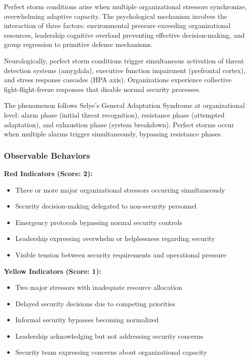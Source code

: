 \documentclass[11pt,a4paper]{article}
\begin{document}
Perfect storm conditions arise when multiple organizational stressors synchronize, overwhelming adaptive capacity. The psychological mechanism involves the interaction of three factors: environmental pressure exceeding organizational resources, leadership cognitive overload preventing effective decision-making, and group regression to primitive defense mechanisms.

Neurologically, perfect storm conditions trigger simultaneous activation of threat detection systems (amygdala), executive function impairment (prefrontal cortex), and stress response cascades (HPA axis). Organizations experience collective fight-flight-freeze responses that disable normal security processes.

The phenomenon follows Selye's\cite{selye1956} General Adaptation Syndrome at organizational level: alarm phase (initial threat recognition), resistance phase (attempted adaptation), and exhaustion phase (system breakdown). Perfect storms occur when multiple alarms trigger simultaneously, bypassing resistance phases.

\subsubsection{Observable Behaviors}

\textbf{Red Indicators (Score: 2):}
\begin{itemize}
\item Three or more major organizational stressors occurring simultaneously
\item Security decision-making delegated to non-security personnel
\item Emergency protocols bypassing normal security controls
\item Leadership expressing overwhelm or helplessness regarding security
\item Visible tension between security requirements and operational pressure
\end{itemize}

\textbf{Yellow Indicators (Score: 1):}
\begin{itemize}
\item Two major stressors with inadequate resource allocation
\item Delayed security decisions due to competing priorities
\item Informal security bypasses becoming normalized
\item Leadership acknowledging but not addressing security concerns
\item Security team expressing concerns about organizational capacity
\end{itemize}
\end{document}
